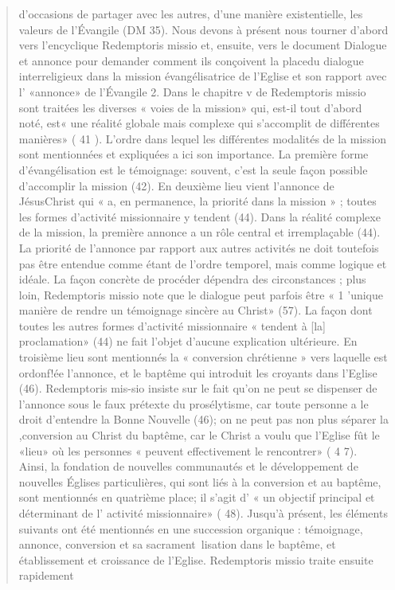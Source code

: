 \begin{quote}
d'occasions de partager avec les autres, d'une manière existentielle,
les valeurs de l'Évangile (DM 35).
Nous devons à présent nous tourner d'abord vers l'encyclique
Redemptoris missio et, ensuite, vers le document Dialogue
et annonce pour demander comment ils conçoivent la
placedu dialogue interreligieux dans la mission évangélisatrice
de l'Eglise et son rapport avec l' «annonce» de l'Évangile 2.
Dans le chapitre v de Redemptoris missio sont traitées les
diverses « voies de la mission» qui, est-il tout d'abord noté,
est« une réalité globale mais complexe qui s'accomplit de différentes
manières» ( 41 ). L'ordre dans lequel les différentes
modalités de la mission sont mentionnées et expliquées a ici
son importance. La première forme d'évangélisation est le
témoignage: souvent, c'est la seule façon possible d'accomplir
la mission (42). En deuxième lieu vient l'annonce de JésusChrist
qui « a, en permanence, la priorité dans la mission » ;
toutes les formes d'activité missionnaire y tendent (44). Dans
la réalité complexe de la mission, la première annonce a un
rôle central et irremplaçable (44). La priorité de l'annonce par
rapport aux autres activités ne doit toutefois pas être entendue
comme étant de l'ordre temporel, mais comme logique et
idéale. La façon concrète de procéder dépendra des circonstances
; plus loin, Redemptoris missio note que le dialogue
peut parfois être « 1 'unique manière de rendre un témoignage
sincère au Christ» (57). La façon dont toutes les autres formes
d'activité missionnaire « tendent à [la] proclamation» (44) ne
fait l'objet d'aucune explication ultérieure.
En troisième lieu sont mentionnés la « conversion chrétienne
» vers laquelle est ordonf!ée l'annonce, et le baptême
qui introduit les croyants dans l'Eglise (46). Redemptoris mis-sio insiste sur le fait qu'on ne peut se dispenser de l'annonce
sous le faux prétexte du prosélytisme, car toute personne a le
droit d'entendre la Bonne Nouvelle (46); on ne peut pas non
plus séparer la ,conversion au Christ du baptême, car le Christ
a voulu que l'Eglise fût le «lieu» où les personnes « peuvent
effectivement le rencontrer» ( 4 7). Ainsi, la fondation de nouvelles
communautés et le développement de nouvelles Églises
particulières, qui sont liés à la conversion et au baptême, sont
mentionnés en quatrième place; il s'agit d' « un objectif principal
et déterminant de l' activité missionnaire» ( 48).
Jusqu'à présent, les éléments suivants ont été mentionnés en
une succession organique : témoignage, annonce, conversion
et sa sacrament~lisation dans le baptême, et établissement et
croissance de l'Eglise. Redemptoris missio traite ensuite rapidement

\end{quote}
